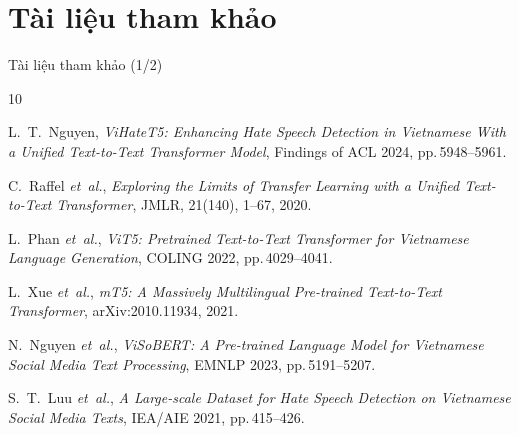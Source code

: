 \documentclass[11pt, aspectratio=169]{beamer}
\begin{document}
\section{Tài liệu tham khảo}

\begin{frame}[shrink=5]{Tài liệu tham khảo (1/2)}
\scriptsize
\begin{thebibliography}{10}

L.~T.~Nguyen,
\textit{ViHateT5: Enhancing Hate Speech Detection in Vietnamese With a Unified Text-to-Text Transformer Model},
Findings of ACL 2024, pp.\,5948--5961.

C.~Raffel \emph{et~al.},
\textit{Exploring the Limits of Transfer Learning with a Unified Text-to-Text Transformer},
JMLR, 21(140), 1--67, 2020.

L.~Phan \emph{et~al.},
\textit{ViT5: Pretrained Text-to-Text Transformer for Vietnamese Language Generation},
COLING 2022, pp.\,4029--4041.

L.~Xue \emph{et~al.},
\textit{mT5: A Massively Multilingual Pre-trained Text-to-Text Transformer},
arXiv:2010.11934, 2021.

N.~Nguyen \emph{et~al.},
\textit{ViSoBERT: A Pre-trained Language Model for Vietnamese Social Media Text Processing},
EMNLP 2023, pp.\,5191--5207.

S.~T.~Luu \emph{et~al.},
\textit{A Large-scale Dataset for Hate Speech Detection on Vietnamese Social Media Texts},
IEA/AIE 2021, pp.\,415--426.

\end{thebibliography}
\end{frame}
\end{document}
